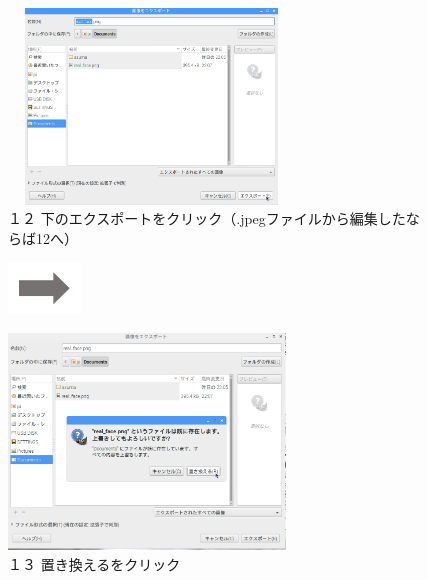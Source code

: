 \documentclass[a4paper,12pt]{jarticle}
\begin{document}
\begin{figure}
	\begin{minipage}{\textwidth}
\begin{minipage}{7.7cm}
\includegraphics[width=7.615cm,height=5.209cm]{textbook-img137.png}\\
１２
下のエクスポートをクリック（.jpegファイルから編集したならば12へ）
\end{minipage}
\includegraphics[width=1.919cm,height=1.365cm]{textbook-img135.png}
\begin{minipage}{7.786cm}
\includegraphics[width=7.352cm,height=5.756cm]{textbook-img136.png}\\
１３ 置き換えるをクリック
\end{minipage}
\end{minipage}

\bigskip



\end{figure}
\end{document}
